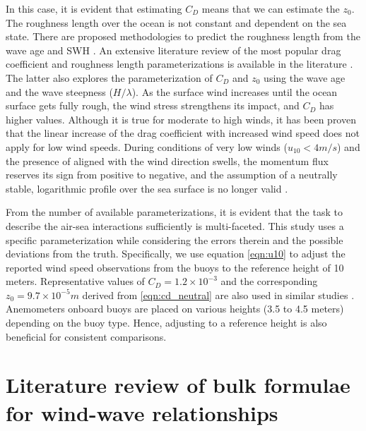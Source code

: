 In this case, it is evident that estimating $C_{D}$ means that we can estimate the $z_{0}$. The roughness length over the ocean is not constant and dependent on the sea state. There are proposed methodologies to predict the roughness length from the wave age and SWH \cite{Taylor2001}. An extensive literature review of the most popular drag coefficient and roughness length parameterizations is available in the literature \cite{Bryant2016, Zhao2019}. The latter also explores the parameterization of $C_{D}$ and $z_{0}$ using the wave age and the wave steepness ($H/\lambda$). As the surface wind increases until the ocean surface gets fully rough, the wind stress strengthens its impact, and $C_{D}$ has higher values. Although it is true for moderate to high winds, it has been proven that the linear increase of the drag coefficient with increased wind speed does not apply for low wind speeds.  During conditions of very low winds ($u_{10} < 4 m/s$)  and the presence of aligned with the wind direction swells, the momentum flux reserves its sign from positive to negative, and the assumption of a neutrally stable, logarithmic profile over the sea surface is no longer valid \cite{Edson2013, Grachev2001, Hanley2008}.

From the number of available parameterizations, it is evident that the task to describe the air-sea interactions sufficiently is multi-faceted. This study uses a specific parameterization while considering the errors therein and the possible deviations from the truth. Specifically, we use equation \ref{eqn:u10} to adjust the reported wind speed observations from the buoys to the reference height of 10 meters. Representative values of $C_{D} = 1.2 \times 10^{-3}$ and the corresponding $z_{0} = 9.7 \times 10^{-5} m$ derived from \ref{eqn:cd_neutral} are also used in similar studies \cite{Ribal2019, Young2017}. Anemometers onboard buoys are placed on various heights (3.5 to 4.5 meters) depending on the buoy type. Hence, adjusting to a reference height is also beneficial for consistent comparisons.





\section{Literature  review  of  bulk  formulae  for  wind-wave  relationships}\label{wind_wave_relationships}


